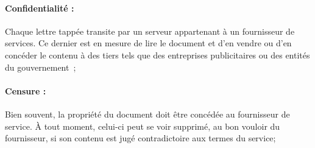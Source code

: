 



\paragraph{Confidentialité :} Chaque lettre tappée transite par un serveur
appartenant à un fournisseur de services. Ce dernier est en mesure de lire le
document et d'en vendre ou d'en concéder le contenu à des tiers tels que des
entreprises publicitaires ou des entités du gouvernement~\cite{gellman2013us};

\paragraph{Censure :} Bien souvent, la propriété du document doit être concédée
au fournisseur de service. À tout moment, celui-ci peut se voir supprimé, au bon
vouloir du fournisseur, si son contenu est jugé contradictoire aux termes du
service;

